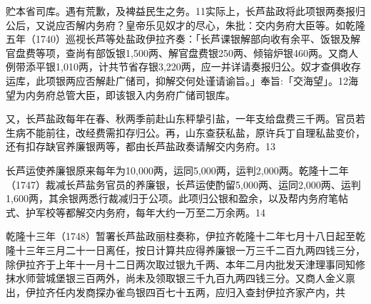 \vfill
\begin{BookNotes}
\end{BookNotes}

\noindent 贮本省司库。遇有荒歉，及裨益民生之务。11实际上，长芦盐政将此项银两奏报归公后，又说应否解内务府？皇帝乐见奴才的尽心，朱批：交内务府大臣等。如乾隆五年（1740）巡视长芦等处盐政伊拉齐奏：「长芦课银解部向收有余平、饭银及解官盘费等项，查尚有部饭银1,500两、解官盘费银250两、倾镕炉银460两。又商人例带添平银1,010两，计共节省存银3,220两，应一并详请奏报归公。奴才查俱收存运库，此项银两应否解赴广储司，抑解交何处谨请谕旨。」奉旨:「交海望」。12海望为内务府总管大臣，即该银入内务府广储司银库。

又，长芦盐政每年在春、秋两季前赴山东秤挚引盐，一年支给盘费三千两。官员若生病不能前往，改经费需扣存归公。再，山东查获私盐，原许兵丁自理私盐变价，还有扣存缺官养廉银两等，都由长芦盐政奏请解交内务府。13

长芦运使养廉银原来每年为10,000两，运同5,000两，运判2,000两。乾隆十二年（1747）裁减长芦盐务官员的养廉银，长芦运使酌留5,000两、运同2,000两、运判1,600两，其余银两悉行裁减归于公项。此项归公银和盈余，以及帮内务府笔帖式、护军校等都解交内务府，每年大约一万至二万余两。14

乾隆十三年（1748）暂署长芦盐政丽柱奏称，伊拉齐乾隆十二年七月十八日起至乾隆十三年三月二十一日离任，按日计算共应得养廉银一万三千二百九两四钱三分，除伊拉齐于上年十一月十二日两次取过银九千两、本年二月内批发天津理事同知修抹水师营城堡银三百两外，尚未及领取银三千九百九两四钱三分。又商人金义禀出，伊拉齐任内发商探办雀鸟银四百七十五两，应归入查封伊拉齐家产内，共

\vfill
\begin{BookNotes}
\end{BookNotes}

